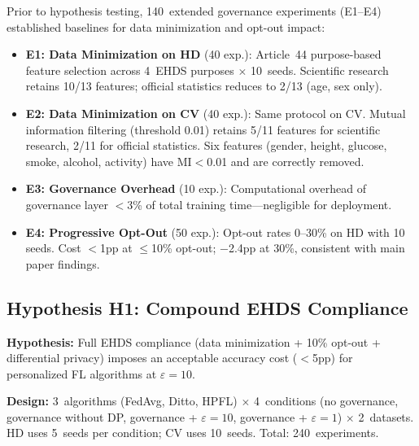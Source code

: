 \documentclass[conference]{IEEEtran}
\begin{document}
Prior to hypothesis testing, 140~extended governance experiments (E1--E4) established baselines for data minimization and opt-out impact:

\begin{itemize}
    \item \textbf{E1: Data Minimization on HD} (40 exp.): Article~44 purpose-based feature selection across 4~EHDS purposes $\times$ 10~seeds. Scientific research retains 10/13 features; official statistics reduces to 2/13 (age, sex only).
    \item \textbf{E2: Data Minimization on CV} (40 exp.): Same protocol on CV. Mutual information filtering (threshold 0.01) retains 5/11 features for scientific research, 2/11 for official statistics. Six features (gender, height, glucose, smoke, alcohol, activity) have MI${<}$0.01 and are correctly removed.
    \item \textbf{E3: Governance Overhead} (10 exp.): Computational overhead of governance layer $<$3\% of total training time---negligible for deployment.
    \item \textbf{E4: Progressive Opt-Out} (50 exp.): Opt-out rates 0--30\% on HD with 10 seeds. Cost $<$1pp at $\leq$10\% opt-out; $-$2.4pp at 30\%, consistent with main paper findings.
\end{itemize}

\subsection{Hypothesis H1: Compound EHDS Compliance}
\label{sec:h1_compliance}

\textbf{Hypothesis:} Full EHDS compliance (data minimization + 10\% opt-out + differential privacy) imposes an acceptable accuracy cost ($<$5pp) for personalized FL algorithms at $\varepsilon{=}10$.

\textbf{Design:} 3~algorithms (FedAvg, Ditto, HPFL) $\times$ 4~conditions (no governance, governance without DP, governance + $\varepsilon{=}10$, governance + $\varepsilon{=}1$) $\times$ 2~datasets. HD uses 5~seeds per condition; CV uses 10~seeds. Total: 240~experiments.
\end{document}
